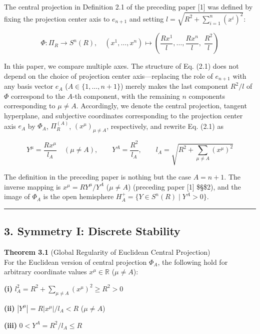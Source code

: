 \documentclass[a4paper,11pt]{article}
\theoremstyle{definition}
\begin{document}
The central projection in Definition 2.1 of the preceding paper {[}1{]} was defined by fixing the projection center axis to \(e_{n+1}\) and setting \(l = \sqrt{R^2 + \sum_{i=1}^{n}(x^i)^2}\):

\[\Phi: \Pi_R \to S^n(R), \quad (x^1, \ldots, x^n) \mapsto \left(\frac{Rx^1}{l}, \ldots, \frac{Rx^n}{l},\; \frac{R^2}{l}\right) \tag{2.1}\]

In this paper, we compare multiple axes. The structure of Eq. (2.1) does not depend on the choice of projection center axis---replacing the role of \(e_{n+1}\) with any basis vector \(e_A\) (\(A \in \{1, \ldots, n+1\}\)) merely makes the last component \(R^2/l\) of \(\Phi\) correspond to the \(A\)-th component, with the remaining \(n\) components corresponding to \(\mu \neq A\). Accordingly, we denote the central projection, tangent hyperplane, and subjective coordinates corresponding to the projection center axis \(e_A\) by \(\Phi_A\), \(\Pi_R^{(A)}\), \((x^\mu)_{\mu \neq A}\), respectively, and rewrite Eq. (2.1) as

\[Y^\mu = \frac{Rx^\mu}{l_A} \quad (\mu \neq A), \qquad Y^A = \frac{R^2}{l_A}, \qquad l_A = \sqrt{R^2 + \sum_{\mu \neq A}(x^\mu)^2} \tag{2.2}\]

The definition in the preceding paper is nothing but the case \(A = n+1\). The inverse mapping is \(x^\mu = RY^\mu/Y^A\) (\(\mu \neq A\)) (preceding paper {[}1{]} \$\S\$2), and the image of \(\Phi_A\) is the open hemisphere \(H_A^+ = \{Y \in S^n(R) \mid Y^A > 0\}\).

\begin{center}\rule{0.5\linewidth}{0.5pt}\end{center}

\subsection{3. Symmetry I: Discrete Stability}\label{symmetry-i-discrete-stability}

\textbf{Theorem 3.1} (Global Regularity of Euclidean Central Projection)\\
For the Euclidean version of central projection \(\Phi_A\), the following hold for arbitrary coordinate values \(x^\mu \in \mathbb{R}\) (\(\mu \neq A\)):

\textbf{(i)} \(l_A^2 = R^2 + \displaystyle\sum_{\mu \neq A}(x^\mu)^2 \geq R^2 > 0\)

\textbf{(ii)} \(|Y^\mu| = R|x^\mu|/l_A < R\) (\(\mu \neq A\))

\textbf{(iii)} \(0 < Y^A = R^2/l_A \leq R\)
\end{document}
